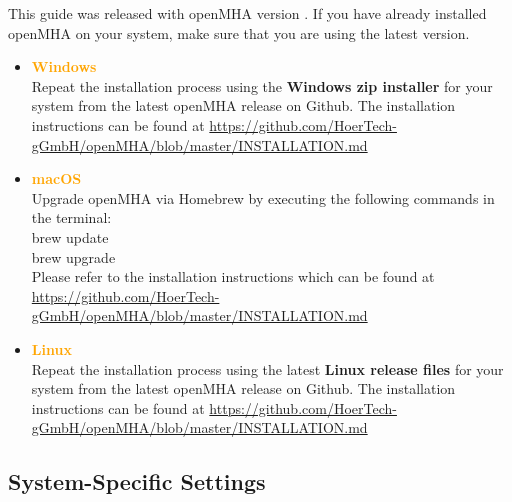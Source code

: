 \documentclass[11pt,a4paper,twoside]{article}
\newcommand{\+}{\discretionary{\mbox{\scriptsize$\hookleftarrow$}}{}{}}
\begin{document}
This guide was released with openMHA version \MHAversion.
If you have already installed openMHA on your system, make
sure that you are using the latest version. \\
\begin{itemize}
\item \textcolor{orange}{\textbf{Windows}} \\
  Repeat the installation process using the \textbf{Windows zip installer}
  for your system from the latest openMHA release on Github.
  The installation instructions can be found at
  \url{https://github.com/HoerTech-gGmbH/openMHA/blob/master/INSTALLATION.md}
\item \textcolor{orange}{\textbf{macOS}} \\
  Upgrade openMHA via Homebrew by executing the following commands in the terminal: \\
  {\ttfamily brew update} \\
  {\ttfamily brew upgrade} \\
  Please refer to the installation instructions which can be found at
  \url{https://github.com/HoerTech-gGmbH/openMHA/blob/master/INSTALLATION.md}
\item \textcolor{orange}{\textbf{Linux}} \\
  Repeat the installation process using the latest \textbf{Linux release files}
  for your system from the latest openMHA release on Github.
  The installation instructions can be found at
  \url{https://github.com/HoerTech-gGmbH/openMHA/blob/master/INSTALLATION.md}
\end{itemize}


\subsection{System-Specific Settings}
\end{document}
